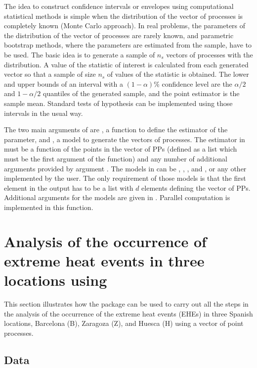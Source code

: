 The idea to construct confidence intervals or envelopes  using computational statistical methods is simple when the distribution of the vector of processes is  completely known (Monte Carlo approach).  In real problems, the parameters of the distribution of the vector of processes are rarely known, and parametric bootstrap methods, where the parameters are estimated from the sample, have to be used. The basic idea is to generate a sample of $n_s$  vectors of processes with the  distribution. A value of the statistic of interest is  calculated from  each generated vector so that a sample of size $n_s$ of values of the statistic is obtained. The lower and upper bounds of an interval with a $(1-\alpha)$\% confidence level  are  the $\alpha /2$ and $1-\alpha/2$  quantiles of the generated sample, and the point estimator is the sample mean. Standard tests of hypothesis  can  be implemented using those intervals in the usual way. 


The two main arguments of   are ,  a function to define the estimator of the parameter, and  , a  model to  generate the vectors of processes. The estimator in  must be a function of the  points in the vector of PPs (defined as a list  which  must be the first argument of the function) and  any number of additional arguments provided by argument  . The models  in     can be   , , , and , or any other implemented by the user. The only requirement of those models is that the first element in the output has to be a list  with $d$ elements defining the vector of PPs. Additional arguments  for the models are given in .  Parallel computation is  implemented in this function.


\section{Analysis of the occurrence of extreme heat events in three locations using }

\label{Section7}


This section illustrates how the package  can be used to carry out all the steps in the  analysis of  the occurrence of the  extreme heat events (EHEs) in three Spanish locations, Barcelona (B), Zaragoza (Z), and Huesca (H) using a vector of point processes.

\subsection{Data}

